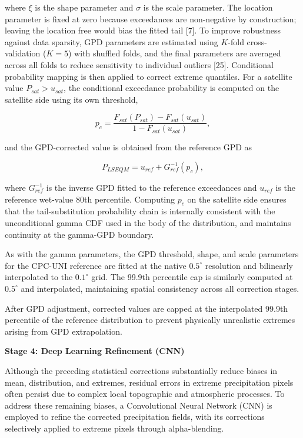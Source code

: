 \documentclass[
]{article}
\begin{document}
where \(\xi\) is the shape parameter and \(\sigma\) is the scale
parameter. The location parameter is fixed at zero because exceedances
are non-negative by construction; leaving the location free would bias
the fitted tail {[}7{]}. To improve robustness against data sparsity,
GPD parameters are estimated using \(K\)-fold cross-validation
(\(K = 5\)) with shuffled folds, and the final parameters are averaged
across all folds to reduce sensitivity to individual outliers {[}25{]}.
Conditional probability mapping is then applied to correct extreme
quantiles. For a satellite value \(P_{sat} > u_{sat}\), the conditional
exceedance probability is computed on the satellite side using its own
threshold,

\[p_c = \frac{F_{sat}(P_{sat}) - F_{sat}(u_{sat})}{1 - F_{sat}(u_{sat})},\]

and the GPD-corrected value is obtained from the reference GPD as

\[P_{LSEQM} = u_{ref} + G_{ref}^{-1}(p_c),\]

where \(G_{ref}^{-1}\) is the inverse GPD fitted to the reference
exceedances and \(u_{ref}\) is the reference wet-value 80th percentile.
Computing \(p_c\) on the satellite side ensures that the
tail-substitution probability chain is internally consistent with the
unconditional gamma CDF used in the body of the distribution, and
maintains continuity at the gamma-GPD boundary.

As with the gamma parameters, the GPD threshold, shape, and scale
parameters for the CPC-UNI reference are fitted at the native
\(0.5^{\circ}\) resolution and bilinearly interpolated to the
\(0.1^{\circ}\) grid. The 99.9th percentile cap is similarly computed at
\(0.5^{\circ}\) and interpolated, maintaining spatial consistency across
all correction stages.

After GPD adjustment, corrected values are capped at the interpolated
99.9th percentile of the reference distribution to prevent physically
unrealistic extremes arising from GPD extrapolation.

\textbf{Stage 4: Deep Learning Refinement (CNN)}

Although the preceding statistical corrections substantially reduce
biases in mean, distribution, and extremes, residual errors in extreme
precipitation pixels often persist due to complex local topographic and
atmospheric processes. To address these remaining biases, a
Convolutional Neural Network (CNN) is employed to refine the corrected
precipitation fields, with its corrections selectively applied to
extreme pixels through alpha-blending.
\end{document}

